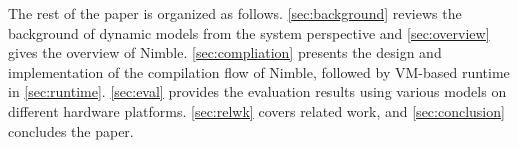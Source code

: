 The rest of the paper is organized as follows. \autoref{sec:background} reviews the background of dynamic models from the system perspective and \autoref{sec:overview} gives the overview of Nimble.
\autoref{sec:compliation} presents the design and implementation of the compilation flow of Nimble, followed by VM-based runtime in \autoref{sec:runtime}. \autoref{sec:eval} provides the evaluation results using various models on different hardware platforms.
\autoref{sec:relwk} covers related work, and \autoref{sec:conclusion} concludes the paper.






